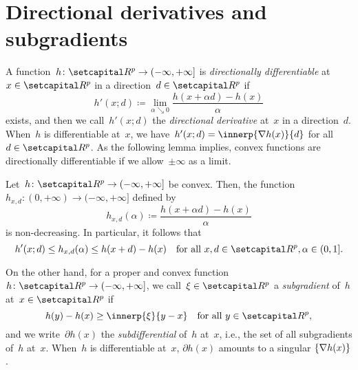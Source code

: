 \documentclass[../main]{subfiles}
\begin{document}
\section{Directional derivatives and subgradients}
A function~$h \colon \setR^p \to (-\infty, +\infty]$ is \emph{directionally differentiable} at~$x \in \setR^p$ in a direction~$d \in \setR^p$ if
\begin{equation} \label{eq:dir_deriv}
    h'(x; d) \coloneqq \lim_{\alpha \searrow 0} \frac{h(x + \alpha d) - h(x)}{\alpha}
\end{equation} 
exists, and then we call~$h'(x; d)$ the \emph{directional derivative} at~$x$ in a direction~$d$.
When~$h$ is differentiable at~$x$, we have~$h'(x; d) = \innerp{\nabla h(x)}{d}$ for all~$d \in \setR^p$.
As the following lemma implies, convex functions are directionally differentiable if we allow~$\pm \infty$ as a limit.
\begin{lemma} 
    Let~$h \colon \setR^p \to (-\infty, +\infty]$ be convex.
    Then, the function~$h_{x, d} \colon (0, +\infty) \to (-\infty, +\infty]$ defined by
    \begin{equation}
        h_{x, d}(\alpha) \coloneqq \frac{h(x + \alpha d) - h(x)}{\alpha}
    \end{equation} 
    is non-decreasing.
    In particular, it follows that
    \begin{equation}
        h'(x; d) \le h_{x, d}(\alpha) \le h(x + d) - h(x) \forallcondition{x, d \in \setR^p, \alpha \in (0, 1]}
    .\end{equation} 
\end{lemma}
On the other hand, for a proper and convex function~$h \colon \setR^p \to (-\infty, +\infty]$, we call~$\xi \in \setR^p$ a \emph{subgradient} of~$h$ at~$x \in \setR^p$ if
\begin{equation} \label{eq:subgrad}
    h(y) - h(x) \ge \innerp{\xi}{y - x} \forallcondition{y \in \setR^p}
,\end{equation} 
and we write~$\partial h(x)$ the \emph{subdifferential} of~$h$ at~$x$, i.e., the set of all subgradients of~$h$ at~$x$.
When~$h$ is differentiable at~$x$, $\partial h(x)$ amounts to a singular $\lbrace\nabla h(x)\rbrace$.
\end{document}
